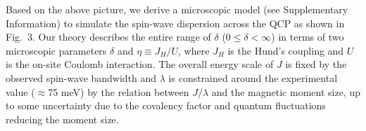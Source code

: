 Based on the above picture, we derive a microscopic model (see Supplementary Information) to simulate the spin-wave dispersion across the QCP as shown in Fig.~3. Our theory describes the entire range of $\delta$ (0$\leq\delta$$<\infty$) in terms of two microscopic parameters $\delta$ and $\eta\equiv J_H/U$, where $J_H$ is the Hund's coupling and $U$ is the on-site Coulomb interaction. The overall energy scale of $J$ is fixed by the observed spin-wave bandwidth and $\lambda$ is constrained around the experimental value ($\approx$75 meV) by the relation between $J/\lambda$ and the magnetic moment size, up to some uncertainty due to the covalency factor and quantum fluctuations reducing the moment size.